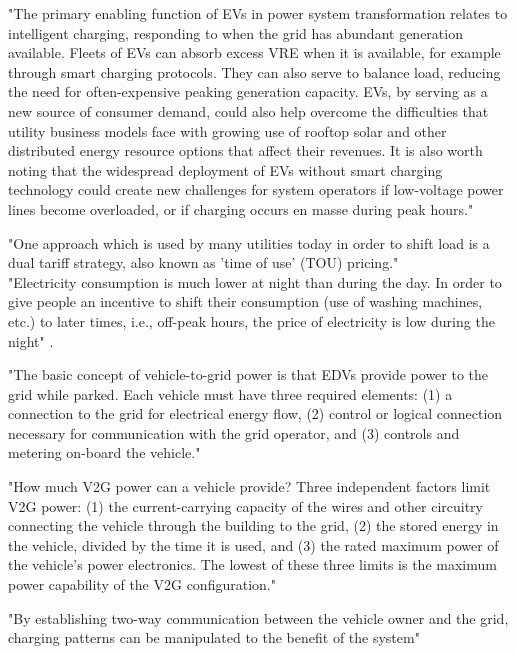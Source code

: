"The primary enabling function of EVs in power system transformation relates to intelligent charging, responding to when the grid has abundant generation available. Fleets of EVs can absorb excess VRE when it is available, for example through smart charging protocols. They can also serve to balance load, reducing the need for often-expensive peaking generation capacity. EVs, by serving as a new source of consumer demand, could also help overcome the difficulties that utility business models face with growing use of rooftop solar and other distributed energy resource options that affect their revenues. It is also worth noting that the widespread deployment of EVs without smart charging technology could create new challenges for system operators if low-voltage power lines become overloaded, or if charging occurs en masse during peak hours." \cite{international_energy_agency_status_2017}

"One approach which is used by many utilities today in order to shift load is a dual tariff strategy, also known as 'time of use' (TOU) pricing." \\
"Electricity consumption is much lower at night than during the day. In order to give people an incentive to shift their consumption (use of washing machines, etc.) to later times, i.e., off-peak hours, the price of electricity is low during the night" \cite{rashid_a_waraich_plug-hybrid_2013}.




"The basic concept of vehicle-to-grid power is that EDVs provide power to the grid while parked. Each vehicle must have three required elements: (1) a connection to the grid for electrical energy flow, (2) control or logical connection necessary for communication with the grid operator, and (3) controls and metering on-board the vehicle." \cite{kempton_vehicle--grid_2005}

"How much V2G power can a vehicle provide? Three independent factors limit V2G power: (1) the current-carrying capacity of the wires and other circuitry connecting the vehicle through the building to the grid, (2) the stored energy in the vehicle, divided by the time it is used, and (3) the rated maximum power of the vehicle's power electronics. The lowest of these three limits is the maximum power capability of the V2G configuration." \cite{kempton_vehicle--grid_2005}

"By establishing two-way communication between the vehicle owner and the grid, charging patterns can be manipulated to the benefit of the system" \cite{emanuele_taibi_power_2018}

